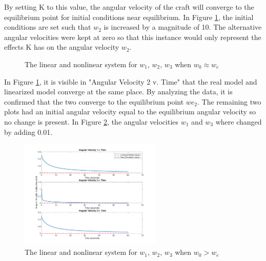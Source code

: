 \documentclass[12pt]{article}
\begin{document}
By setting K to this value, the angular velocity of the craft will converge to the equilibrium point for initial conditions near equilibrium. In Figure \ref{fig:4}, the initial conditions are set such that $w_{2}$ is increased by a magnitude of 10. The alternative angular velocities were kept at zero so that this instance would only represent the effects K has on the angular velocity $w_{2}$. \clearpage
\begin{figure}[h!]
\centering
{}
\caption{The linear and nonlinear system for $w_{1}$, $w_{2}$, $w_{3}$ when $w_{0} \approx w_{e}$}
\label{fig:4}
\end{figure}
In Figure \ref{fig:4}, it is visible in "Angular Velocity 2 v. Time" that the real model and linearized model converge at the same place. By analyzing the data, it is confirmed that the two converge to the equilibrium point $we_{2}$. The remaining two plots had an initial angular velocity equal to the equilibrium angular velocity so no change is present. In Figure \ref{fig:5}, the angular velocities $w_{1}$ and $w_{3}$ where changed by adding 0.01.
\begin{figure}[h!]
\centering
\includegraphics[width=0.6\textwidth]{wall3.pdf}
\caption{The linear and nonlinear system for $w_{1}$, $w_{2}$, $w_{3}$ when $w_{0} > w_{e}$ }
\label{fig:5}
\end{figure}
\end{document}
